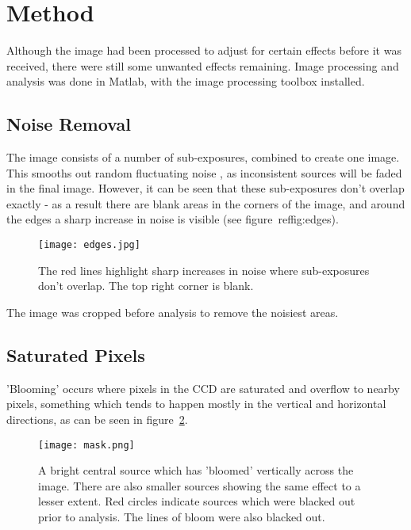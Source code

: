 \documentclass[a4paper,11pt,twoside]{article}
\begin{document}
\section{Method}

Although the image had been processed to adjust for certain effects 
before it was received, there were still some unwanted effects 
remaining. Image processing and analysis was done in Matlab, with 
the image processing toolbox installed.

\subsection{Noise Removal}

The image consists of a number of sub-exposures, combined to create one image. This smooths out random fluctuating noise , as inconsistent sources will be faded in the final image.
However, it can be seen that these sub-exposures don't overlap exactly - as a result there are blank areas in the corners of the image, and around the edges a sharp increase in noise is visible (see figure~ref{fig:edges}). 

\begin{figure}[htb]
  \centering
  \texttt{[image: edges.jpg]}
  \caption{The red lines highlight sharp increases in noise where 
sub-exposures don't overlap. The top right corner is blank.}
  \label{fig:edges}
\end{figure}

The image was cropped before analysis to remove the noisiest areas.

\subsection{Saturated Pixels}

'Blooming' occurs where pixels in the CCD are saturated and overflow to nearby pixels, something which tends to happen mostly in the vertical and horizontal directions, as can be seen in figure~\ref{fig:mask}.

\begin{figure}[htb]
  \centering
  \texttt{[image: mask.png]}
  \caption{A bright central source which has 'bloomed' vertically across the image. There are also smaller sources showing the same effect to a lesser extent. Red circles indicate sources which were blacked out prior to analysis. The lines of bloom were also blacked out.}
  \label{fig:mask}
\end{figure}
\end{document}

